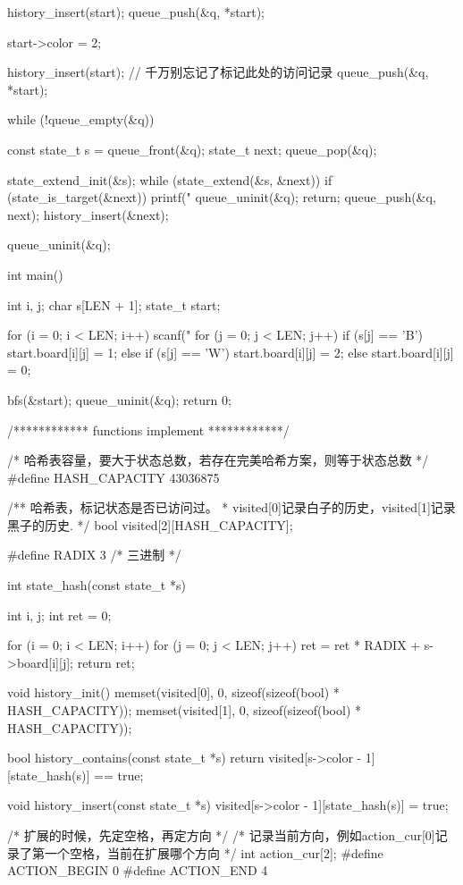 \begin{Codex}[label=four_adjacent.c]
{    history_insert(start);
    queue_push(&q, *start);

    start->color = 2;

    history_insert(start); // 千万别忘记了标记此处的访问记录
    queue_push(&q, *start);

    while (!queue_empty(&q)) {
        const state_t s = queue_front(&q);
        state_t next;
        queue_pop(&q);

        state_extend_init(&s);
        while (state_extend(&s, &next)) {
            if (state_is_target(&next)) {
                printf("%
                queue_uninit(&q);
                return;
            }
            queue_push(&q, next);
            history_insert(&next);
        }
    }
    queue_uninit(&q);
}

int main() {
    int i, j;
    char s[LEN + 1];
    state_t start;

    for (i = 0; i < LEN; i++) {
        scanf("%
        for (j = 0; j < LEN; j++) {
            if (s[j] == 'B') start.board[i][j] = 1;
            else if (s[j] == 'W') start.board[i][j] = 2;
            else start.board[i][j] = 0;
        }
    }

    bfs(&start);
    queue_uninit(&q);
    return 0;
}

/************ functions implement ************/

/* 哈希表容量，要大于状态总数，若存在完美哈希方案，则等于状态总数 */
#define HASH_CAPACITY 43036875

/** 哈希表，标记状态是否已访问过。
 * visited[0]记录白子的历史，visited[1]记录黑子的历史.
 */
bool visited[2][HASH_CAPACITY];

#define RADIX 3 /* 三进制 */

int state_hash(const state_t *s) {
    int i, j;
    int ret = 0;

    for (i = 0; i < LEN; i++) {
        for (j = 0; j < LEN; j++) {
            ret = ret * RADIX + s->board[i][j];
        }
    }
    return ret;
}

void history_init() {
    memset(visited[0], 0, sizeof(sizeof(bool) * HASH_CAPACITY));
    memset(visited[1], 0, sizeof(sizeof(bool) * HASH_CAPACITY));
}

bool history_contains(const state_t *s) {
    return visited[s->color - 1][state_hash(s)] == true;
}

void history_insert(const state_t *s) {
    visited[s->color - 1][state_hash(s)] = true;
}

/* 扩展的时候，先定空格，再定方向 */
/* 记录当前方向，例如action_cur[0]记录了第一个空格，当前在扩展哪个方向
 */
int action_cur[2];
#define ACTION_BEGIN 0
#define ACTION_END 4


\end{Codex}
